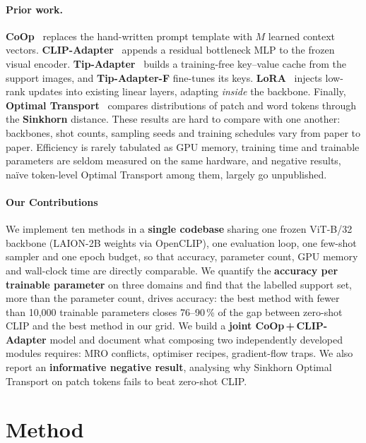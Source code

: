 \documentclass[10pt,twocolumn,letterpaper]{article}
\begin{document}
\paragraph{Prior work.}
\textbf{CoOp}~\cite{zhou2022learning} replaces the hand-written prompt
template with $M$ learned context vectors.
\textbf{CLIP-Adapter}~\cite{gao2024clipadapter} appends a residual
bottleneck MLP to the frozen visual encoder.
\textbf{Tip-Adapter}~\cite{zhang2022tip} builds a training-free key--value
cache from the support images, and \textbf{Tip-Adapter-F} fine-tunes its
keys.  \textbf{LoRA}~\cite{hu2022lora} injects low-rank updates into
existing linear layers, adapting \emph{inside} the backbone.  Finally,
\textbf{Optimal Transport}~\cite{cuturi2013sinkhorn} compares distributions
of patch and word tokens through the \textbf{Sinkhorn} distance.  These results are
hard to compare with one another: backbones, shot counts, sampling seeds
and training schedules vary from paper to paper.  Efficiency is rarely
tabulated as GPU memory, training time and trainable parameters are seldom
measured on the same hardware, and negative results, na\"ive token-level
Optimal Transport among them, largely go unpublished.

\paragraph{Our Contributions}
We implement ten methods in a \textbf{single codebase} sharing one frozen
ViT-B/32 backbone (LAION-2B weights via OpenCLIP), one evaluation loop,
one few-shot sampler and one epoch budget, so that accuracy, parameter
count, GPU memory and wall-clock time are directly comparable.  We
quantify the \textbf{accuracy per trainable parameter} on three domains
and find that the labelled support set, more than the parameter count,
drives accuracy: the best method with fewer than 10{,}000 trainable
parameters closes 76--90\,\% of the gap between zero-shot CLIP and the
best method in our grid.  We build a \textbf{joint CoOp\,+\,CLIP-Adapter}
model and document what composing two independently developed modules
requires: MRO conflicts, optimiser recipes, gradient-flow traps.  We also
report an \textbf{informative negative result}, analysing why Sinkhorn
Optimal Transport on patch tokens fails to beat zero-shot CLIP.


\section{Method}\label{sec:method}
\end{document}

